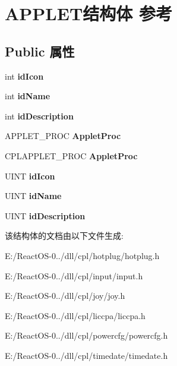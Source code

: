 \hypertarget{struct_a_p_p_l_e_t}{}\section{A\+P\+P\+L\+E\+T结构体 参考}
\label{struct_a_p_p_l_e_t}
\subsection*{Public 属性}
\begin{DoxyCompactItemize}
\item 
\mbox{\label{struct_a_p_p_l_e_t_aa872d3c929a3f5228ab9ff8bbfd06a79}} 
int {\bfseries id\+Icon}
\item 
\mbox{\label{struct_a_p_p_l_e_t_a44012ff87d0f35a1f9835c667f67ea48}} 
int {\bfseries id\+Name}
\item 
\mbox{\label{struct_a_p_p_l_e_t_a1760223440b4d2f2a50748a5c842607b}} 
int {\bfseries id\+Description}
\item 
\mbox{\label{struct_a_p_p_l_e_t_ab7b11877c588d697e4aebf7ce90952df}} 
A\+P\+P\+L\+E\+T\+\_\+\+P\+R\+OC {\bfseries Applet\+Proc}
\item 
\mbox{\label{struct_a_p_p_l_e_t_ae629cac21312aaeb0da1b2dfc425b3d5}} 
C\+P\+L\+A\+P\+P\+L\+E\+T\+\_\+\+P\+R\+OC {\bfseries Applet\+Proc}
\item 
\mbox{\label{struct_a_p_p_l_e_t_a1c4b265e65b9cc7c569d4176a06766ea}} 
U\+I\+NT {\bfseries id\+Icon}
\item 
\mbox{\label{struct_a_p_p_l_e_t_a2b9dcc1c72e2830f491672580136c651}} 
U\+I\+NT {\bfseries id\+Name}
\item 
\mbox{\label{struct_a_p_p_l_e_t_acf7bf8093a5ef81d7664bf61f0babb62}} 
U\+I\+NT {\bfseries id\+Description}
\end{DoxyCompactItemize}


该结构体的文档由以下文件生成\+:\begin{DoxyCompactItemize}
\item 
E\+:/\+React\+O\+S-\/0../dll/cpl/hotplug/hotplug.\+h\item 
E\+:/\+React\+O\+S-\/0../dll/cpl/input/input.\+h\item 
E\+:/\+React\+O\+S-\/0../dll/cpl/joy/joy.\+h\item 
E\+:/\+React\+O\+S-\/0../dll/cpl/liccpa/liccpa.\+h\item 
E\+:/\+React\+O\+S-\/0../dll/cpl/powercfg/powercfg.\+h\item 
E\+:/\+React\+O\+S-\/0../dll/cpl/timedate/timedate.\+h\end{DoxyCompactItemize}
